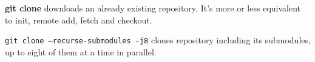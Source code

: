 %

\textbf{git clone} downloads an already existing repository.
It's more or less equivalent to init, remote add, fetch and checkout.

\texttt{git clone --recurse-submodules -j8} clones repository including its submodules, up to eight of them at a time in parallel.

%